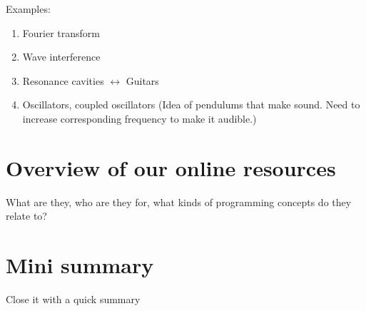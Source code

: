 Examples:
\begin{enumerate}
    \item Fourier transform
    \item Wave interference
    \item Resonance cavities $\leftrightarrow{}$ Guitars
    \item Oscillators, coupled oscillators (Idea of pendulums that make sound. Need to increase corresponding frequency to make it audible.)
\end{enumerate}

\section{Overview of our online resources}
What are they, who are they for, what kinds of programming concepts do they relate to?

\section{Mini summary}
Close it with a quick summary

